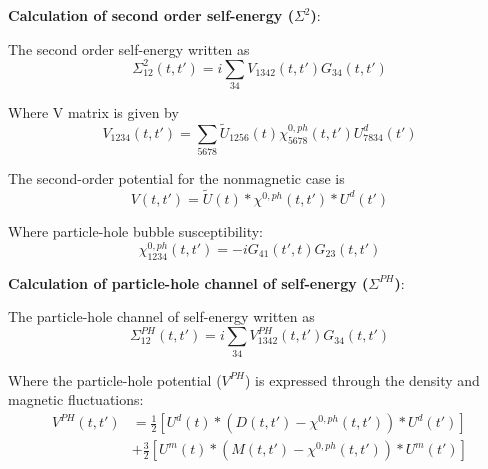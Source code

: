 



\vspace*{0.2cm}
{\bf Calculation of second order self-energy ($\Sigma^{2}$)}:

The second order self-energy written as 
\begin{equation}
\Sigma^{2}_{12}(t,t') = i \sum_{34} V_{1342}(t,t') G_{34} (t,t') 
\end{equation}

Where V matrix is given by 
\begin{equation}
V_{1234}(t,t') = \sum_{5678} \tilde{U}_{1256}(t) \chi^{0,ph}_{5678} (t,t') U^d_{7834} (t') 
\end{equation}

The second-order potential for the nonmagnetic case is
\begin{equation}
V(t,t') = \tilde{U}(t)*\chi^{0,ph}(t,t')*U^d(t') %
\end{equation}

Where particle-hole bubble susceptibility:
\begin{equation}
\chi^{0,ph}_{1234}(t,t') = -i G_{41}(t',t) G_{23}(t,t')
\end{equation}

\vspace*{0.2cm}
{\bf Calculation of particle-hole channel of self-energy ($\Sigma^{PH}$)}:

The particle-hole channel of self-energy written as 
\begin{equation}
\Sigma^{PH}_{12}(t,t') = i \sum_{34} V^{PH}_{1342}(t,t') G_{34} (t,t') 
\end{equation}

Where the particle-hole potential ($V^{PH}$) is expressed through the density and magnetic fluctuations:
\begin{subequations}
\begin{align}
V^{PH}(t,t')
&=
	\frac{1}{2}[U^d(t)*(D(t,t')-\chi^{0,ph}(t,t'))*U^d(t')]
		\nonumber
		\\
 &+
\frac{3}{2}[U^m(t)*(M(t,t')-\chi^{0,ph}(t,t'))*U^m(t')] %
\end{align}
\end{subequations}

